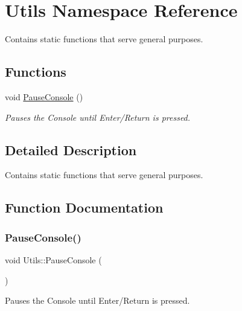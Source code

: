 \hypertarget{namespace_utils}{}\section{Utils Namespace Reference}
\label{namespace_utils}


Contains static functions that serve general purposes.  


\subsection*{Functions}
\begin{DoxyCompactItemize}
\item 
void \mbox{\hyperlink{namespace_utils_ac9acd31f817733c17df6460b85553c9b}{Pause\+Console}} ()
\begin{DoxyCompactList}\small\item\em Pauses the Console until Enter/\+Return is pressed. \end{DoxyCompactList}\end{DoxyCompactItemize}


\subsection{Detailed Description}
Contains static functions that serve general purposes. 

\subsection{Function Documentation}
\mbox{\label{namespace_utils_ac9acd31f817733c17df6460b85553c9b}} 
\subsubsection{\texorpdfstring{Pause\+Console()}{PauseConsole()}}
{\footnotesize\ttfamily void Utils\+::\+Pause\+Console (\begin{DoxyParamCaption}{ }\end{DoxyParamCaption})}



Pauses the Console until Enter/\+Return is pressed. 

